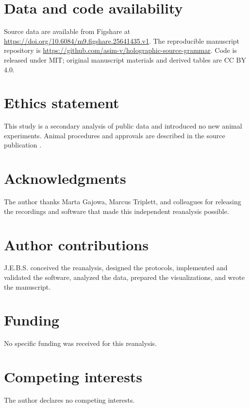 \documentclass[10pt,twocolumn]{article}
\begin{document}
\section*{Data and code availability}

Source data are available from Figshare at
\url{https://doi.org/10.6084/m9.figshare.25641435.v1}. The reproducible
manuscript repository is
\url{https://github.com/asim-v/holographic-source-grammar}. Code is released
under MIT; original manuscript materials and derived tables are CC BY 4.0.

\section*{Ethics statement}

This study is a secondary analysis of public data and introduced no new
animal experiments. Animal procedures and approvals are described in the
source publication \citep{triplett2025rapid}.

\section*{Acknowledgments}

The author thanks Marta Gajowa, Marcus Triplett, and colleagues for releasing
the recordings and software that made this independent reanalysis possible.

\section*{Author contributions}

J.E.B.S. conceived the reanalysis, designed the protocols, implemented and
validated the software, analyzed the data, prepared the visualizations, and
wrote the manuscript.

\section*{Funding}

No specific funding was received for this reanalysis.

\section*{Competing interests}

The author declares no competing interests.

\balance


\end{document}
